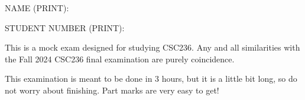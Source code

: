 \documentclass{article}
\begin{document}
    {\Large NAME (PRINT): \enspace\hrulefill}

    \bigskip

    {\Large STUDENT NUMBER (PRINT): \enspace\hrulefill}

    \bigskip

    \begin{center}
    \end{center}

    This is a mock exam designed for studying CSC236. Any and all similarities with the Fall 2024 CSC236 final examination are purely coincidence.

    This examination is meant to be done in 3 hours, but it is a little bit long, so do not worry about finishing. Part marks are very easy to get!

    \pagebreak
\end{document}
